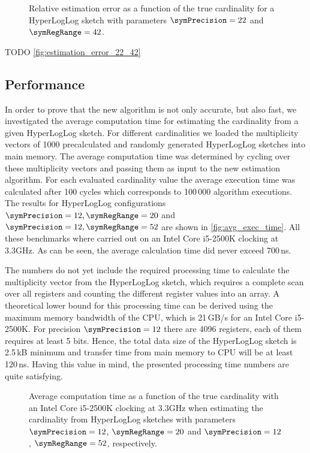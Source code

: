 \documentclass[a4paper]{scrartcl}
\begin{document}
\begin{figure}
\centering

\caption{Relative estimation error as a function of the true cardinality for a HyperLogLog sketch with parameters $\symPrecision = 22$ and $\symRegRange=42$.}
\label{fig:estimation_error_22_42}
\end{figure}

TODO \autoref{fig:estimation_error_22_42}

\subsection{Performance}
In order to prove that the new algorithm is not only accurate, but also fast, we investigated the average computation time for estimating the cardinality from a given HyperLogLog sketch. For different cardinalities we loaded the multiplicity vectors of 1000 precalculated and randomly generated HyperLogLog sketches into main memory. The average computation time was determined by cycling over these multiplicity vectors and passing them as input to the new estimation algorithm. For each evaluated cardinality value the average execution time was calculated after 100 cycles which corresponds to 100\,000 algorithm executions. The results for HyperLogLog configurations $\symPrecision=12, \symRegRange=20$ and $\symPrecision=12, \symRegRange=52$ are shown in \autoref{fig:avg_exec_time}. All these benchmarks where carried out on an Intel Core i5-2500K clocking at 3.3GHz. As can be seen, the average calculation time did never exceed 700\,ns. 

The numbers do not yet include the required processing time to calculate the multiplicity vector from the HyperLogLog sketch, which requires a complete scan over all registers and counting the different register values into an array. A theoretical lower bound for this processing time can be derived using the maximum memory bandwidth of the CPU, which is 21\,GB/s for an Intel Core i5-2500K. For precision $\symPrecision=12$ there are 4096 registers, each of them requires at least 5 bits. Hence, the total data size of the HyperLogLog sketch is 2.5\,kB minimum and transfer time from main memory to CPU will be at least 120\,ns. Having this value in mind, the presented processing time numbers are quite satisfying.

\begin{figure}
\centering

\caption{Average computation time as a function of the true cardinality with an Intel Core i5-2500K clocking at 3.3GHz when estimating the cardinality from HyperLogLog sketches with parameters $\symPrecision=12$, $\symRegRange=20$ and $\symPrecision=12$, $\symRegRange=52$, respectively.}
\label{fig:avg_exec_time}
\end{figure}
\end{document}
